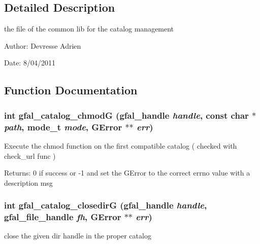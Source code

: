 \subsection{Detailed Description}
the file of the common lib for the catalog management 

\begin{Desc}
\item[Author:]Devresse Adrien \end{Desc}
\begin{Desc}
\item[Date:]8/04/2011 \end{Desc}


\subsection{Function Documentation}
\subsubsection{\setlength{\rightskip}{0pt plus 5cm}int gfal\_\-catalog\_\-chmod\-G (gfal\_\-handle {\em handle}, const char $\ast$ {\em path}, mode\_\-t {\em mode}, GError $\ast$$\ast$ {\em err})}\label{gfal__common__catalog_8c_12b613d1db9c17e70e679ef7285f6a6f}


Execute the chmod function on the first compatible catalog ( checked with check\_\-url func ) \begin{Desc}
\item[Returns:]0 if success or -1 and set the GError to the correct errno value with a description msg \end{Desc}
\subsubsection{\setlength{\rightskip}{0pt plus 5cm}int gfal\_\-catalog\_\-closedir\-G (gfal\_\-handle {\em handle}, gfal\_\-file\_\-handle {\em fh}, GError $\ast$$\ast$ {\em err})}\label{gfal__common__catalog_8c_348fe15690faed2e2731d15eb6cc7856}


close the given dir handle in the proper catalog 
